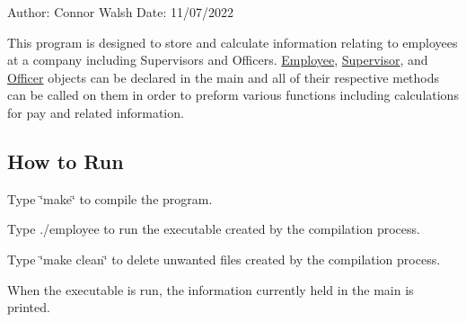 Author\+: Connor Walsh Date\+: 11/07/2022

This program is designed to store and calculate information relating to employees at a company including Supervisors and Officers. \hyperlink{classEmployee}{Employee}, \hyperlink{classSupervisor}{Supervisor}, and \hyperlink{classOfficer}{Officer} objects can be declared in the main and all of their respective methods can be called on them in order to preform various functions including calculations for pay and related information.

\subsection*{How to Run}


\begin{DoxyItemize}
\item Type \char`\"{}make\char`\"{} to compile the program.
\item Type ./employee to run the executable created by the compilation process.
\item Type \char`\"{}make clean\char`\"{} to delete unwanted files created by the compilation process.
\item When the executable is run, the information currently held in the main is printed. 
\end{DoxyItemize}